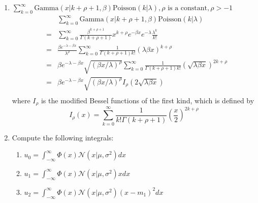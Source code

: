 \documentclass[10pt,a4paper]{article}
\def\MN{{\mathcal N}}
\begin{document}
\begin{enumerate}
\item
$\sum\limits_{k=0}^\infty \mbox{Gamma}(x | k+\rho+1, \beta) \mbox{Poisson} (k | \lambda),  \rho\mbox{ is a constant},\rho>-1$
\begin{eqnarray*}
&& \sum\limits_{k=0}^\infty \mbox{Gamma}(x | k+\rho+1, \beta) \mbox{Poisson} (k | \lambda) \\
& = & \sum\limits_{k=0}^\infty \frac{\beta^{k+\rho+1}}{\Gamma(k+\rho+1)}x^{k+\rho}e^{-\beta x}e^{-\lambda}\frac{\lambda^{k}}{k!} \\
& = & \frac{\beta e^{-\lambda-\beta x}}{\lambda^{\rho}}\sum\limits_{k=0}^\infty \frac{1}{\Gamma(k+\rho+1)k!}(\lambda\beta x)^{k+\rho} \\
& = & \beta e^{-\lambda-\beta x}\sqrt{\left(\beta x/\lambda\right)^\rho}\sum\limits_{k=0}^\infty \frac{1}{\Gamma(k+\rho+1)k!}\left(\sqrt{\lambda\beta x}\right)^{2k+\rho} \\
& = & \beta e^{-\lambda-\beta x}\sqrt{\left(\beta x/\lambda\right)^\rho} I_\rho\left(2\sqrt{\lambda\beta x}\right) \\
\end{eqnarray*}
where $I_\rho$ is the modified Bessel functions of the first kind, which is defined by
$$I_\rho(x) =\sum_{k=0}^\infty \frac{1}{k! \Gamma(k+\rho+1)}\left(\frac{x}{2}\right)^{2k+\rho}$$

\item Compute the following integrals:
\begin{enumerate}
\item $u_0 = \int_{-\infty}^{\infty} \Phi(x) \MN(x|\mu, \sigma^2) dx$
\item $u_1 = \int_{-\infty}^{\infty} \Phi(x) \MN(x|\mu, \sigma^2)x dx$
\item $u_2 = \int_{-\infty}^{\infty} \Phi(x) \MN(x|\mu, \sigma^2)(x-m_1)^2 dx$


\end{enumerate}
\end{enumerate}
\end{document}

